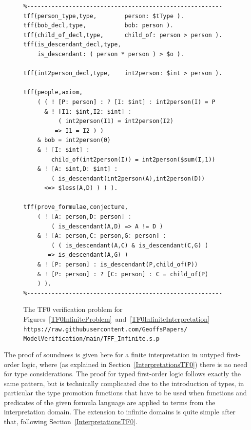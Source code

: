 \documentclass[letterpaper]{article}
\begin{document}
\begin{figure}[htbp]
\scriptsize
{}
\begin{verbatim}
%--------------------------------------------------------
tff(person_type,type,        person: $tType ).
tff(bob_decl,type,           bob: person ).
tff(child_of_decl,type,      child_of: person > person ).
tff(is_descendant_decl,type, 
    is_descendant: ( person * person ) > $o ).

tff(int2person_decl,type,    int2person: $int > person ).

tff(people,axiom,
    ( ( ! [P: person] : ? [I: $int] : int2person(I) = P
      & ! [I1: $int,I2: $int] : 
          ( int2person(I1) = int2person(I2) 
         => I1 = I2 ) )
    & bob = int2person(0)
    & ! [I: $int] : 
        child_of(int2person(I)) = int2person($sum(I,1))
    & ! [A: $int,D: $int] : 
        ( is_descendant(int2person(A),int2person(D)) 
      <=> $less(A,D) ) ) ).

tff(prove_formulae,conjecture,
    ( ! [A: person,D: person] : 
        ( is_descendant(A,D) => A != D )
    & ! [A: person,C: person,G: person] :
        ( ( is_descendant(A,C) & is_descendant(C,G) )
       => is_descendant(A,G) )
    & ! [P: person] : is_descendant(P,child_of(P))
    & ! [P: person] : ? [C: person] : C = child_of(P) 
    ) ).
%--------------------------------------------------------
\end{verbatim}
\caption{The TF0 verification problem for 
Figures~\ref{TF0InfiniteProblem}~and~\ref{TF0InfiniteInterpretation}\\
{\scriptsize {\tt https://raw.githubusercontent.com/GeoffsPapers/\\
ModelVerification/main/TFF\_Infinite.s.p}}}
\label{TF0InfiniteVerification}
\end{figure}

The proof of soundness is given here for a finite interpretation in untyped first-order logic, 
where (as explained in Section~\ref{InterpretationsTF0}) there is no need for type considerations.
The proof for typed first-order logic follows exactly the same pattern, but is technically
complicated due to the introduction of types, in particular the type promotion functions that have 
to be used when functions and predicates of the given formula language are applied to terms from 
the interpretation domain.
The extension to infinite domains is quite simple after that, following 
Section~\ref{InterpretationsTF0}.
\end{document}
